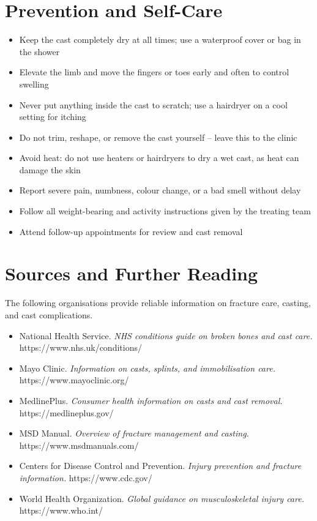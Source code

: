 \section*{Prevention and Self-Care}
\begin{itemize}
    \item Keep the cast completely dry at all times; use a waterproof cover or bag in the shower
    \item Elevate the limb and move the fingers or toes early and often to control swelling
    \item Never put anything inside the cast to scratch; use a hairdryer on a cool setting for itching
    \item Do not trim, reshape, or remove the cast yourself -- leave this to the clinic
    \item Avoid heat: do not use heaters or hairdryers to dry a wet cast, as heat can damage the skin
    \item Report severe pain, numbness, colour change, or a bad smell without delay
    \item Follow all weight-bearing and activity instructions given by the treating team
    \item Attend follow-up appointments for review and cast removal
\end{itemize}

\section*{Sources and Further Reading}
The following organisations provide reliable information on fracture care, casting, and cast complications.

\begin{itemize}
    \item National Health Service. \textit{NHS conditions guide on broken bones and cast care.} https://www.nhs.uk/conditions/
    \item Mayo Clinic. \textit{Information on casts, splints, and immobilisation care.} https://www.mayoclinic.org/
    \item MedlinePlus. \textit{Consumer health information on casts and cast removal.} https://medlineplus.gov/
    \item MSD Manual. \textit{Overview of fracture management and casting.} https://www.msdmanuals.com/
    \item Centers for Disease Control and Prevention. \textit{Injury prevention and fracture information.} https://www.cdc.gov/
    \item World Health Organization. \textit{Global guidance on musculoskeletal injury care.} https://www.who.int/
\end{itemize}
